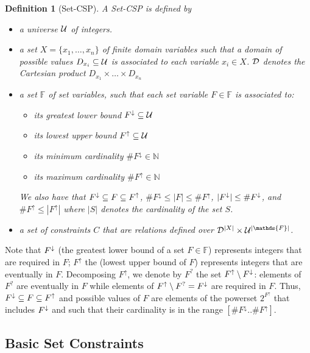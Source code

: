\documentclass[3p,authoryear,times]{elsarticle}
\newtheorem{definition}{Definition}
\newcommand{\card}[1]{|#1|}
\newcommand{\MS}[1]{{{#1}^{\uparrow}}}
\newcommand{\ms}[1]{{\MakeUppercase{#1}^\downarrow}}
\newcommand{\MSF}[0]{\MS{F}}
\newcommand{\msF}[0]{\ms{f}}
\newcommand{\msFb}[0]{{F^{?}}}
\newcommand{\MC}[1]{{\#{#1}^\uparrow{}}}
\newcommand{\mc}[1]{{\#{#1}^\downarrow}}
\newcommand{\MCF}[0]{\MC{F}{}}
\newcommand{\mcF}[0]{\mc{F}{}}
\begin{document}
\begin{definition}[Set-CSP]
A Set-CSP is defined by
\begin{itemize}
\item a universe $\cal U$ of integers.
\item 
a set $X=\{x_1, \ldots, x_n\}$ of finite domain variables such that a domain of possible values $D_{x_i} \subseteq {\cal U}$ is associated to each  variable $x_i \in {X}$.  $ {\cal D}$ denotes the Cartesian product $D_{x_1} \times \ldots \times D_{x_n}$
\item 
a set $\mathds{F}$ of set variables, such that each set variable $F \in  \mathds{F}$ is associated to:
\begin{itemize}
\item  its greatest lower bound  $\msF \subseteq {\cal U}$
\item its  lowest upper bound  $\MSF \subseteq {\cal U}$
\item its minimum cardinality  $\mcF \in \mathds{N}$
\item its maximum cardinality  $\MCF \in \mathds{N}$
\end{itemize}
We also have that $\msF   \subseteq F \subseteq \MSF $, $\mcF   \leq  \card{F} \leq \MCF $, 
%
$\card{\msF} \leq \mcF$, and  $\MCF \leq \card{\MSF}$ where $\card{S}$ denotes the cardinality of the set $S$.

\item 
a set of constraints $C$ that are relations defined over ${\cal D}^{|X|} \times {\cal U}^{|\mathds{F}|}$.  
\end{itemize}

\end{definition}

Note that $\msF$ (the greatest lower bound of a set $F \in \mathds{F}$) represents integers that are required in $F$; $\MSF$ the (lowest upper bound of $F$) represents integers that are eventually in $F$.  Decomposing $\MSF$, we denote by $\msFb$ the set $\MSF \setminus \msF$: elements of $\msFb$ are eventually in $F$ while elements of $\MSF \setminus \msFb=\msF$ are required in $F$.
Thus, $\msF \subseteq F \subseteq \MSF$ and possible values of $F$ are elements of the powerset $2^{\MSF}$ that includes $\msF$ and such that their cardinality is in the range $[\mcF..\MCF]$. 





\subsection{Basic Set Constraints}
\end{document}
